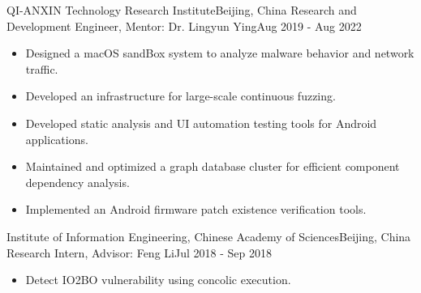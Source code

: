 \shorterSection{\textcolor{titleblue}{Work Experience}}
\resumeSubHeadingListStart

\resumeSubheading
{QI-ANXIN Technology Research Institute}{Beijing, China}
{Research and Development Engineer, Mentor: Dr. Lingyun Ying}{Aug 2019 - Aug 2022}
\begin{itemize}[label=\textbullet, leftmargin=+6pt]
	\item Designed a macOS sandBox system to analyze malware behavior and network traffic.
	\item Developed an infrastructure for large-scale continuous fuzzing.
	\item Developed static analysis and UI automation testing tools for Android applications.
	\item Maintained and optimized a graph database cluster for efficient component dependency analysis.
	\item Implemented an Android firmware patch existence verification tools.
\end{itemize}

\resumeSubheading
{Institute of Information Engineering, Chinese Academy of Sciences}{Beijing, China}
{Research Intern, Advisor: Feng Li}{Jul 2018 - Sep 2018}
\begin{itemize}[label=\textbullet, leftmargin=+6pt]
	\item Detect IO2BO vulnerability using concolic execution.
\end{itemize}

\resumeSubHeadingListEnd
